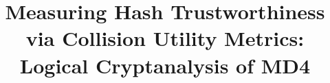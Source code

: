 \documentclass[conference]{IEEEtran}
\begin{document}
%
\title{Measuring Hash Trustworthiness via Collision Utility Metrics: Logical Cryptanalysis of MD4}




\vspace{3in}


%
\end{document}
